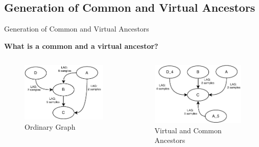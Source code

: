 \subsection{Generation of Common and Virtual Ancestors}
\begin{frame}{Generation of Common and Virtual Ancestors}

\textbf{What is a common and a virtual ancestor?}

\begin{columns}
        \begin{figure}
            \includegraphics[width=\textwidth]{figuras/graphVirt.pdf}
            \caption{Ordinary Graph}
        \end{figure}
        \begin{figure}
            \includegraphics[width=\textwidth]{figuras/cVirt.pdf}
            \caption{Virtual and Common Ancestors}
        \end{figure}

\end{columns}
\end{frame}

